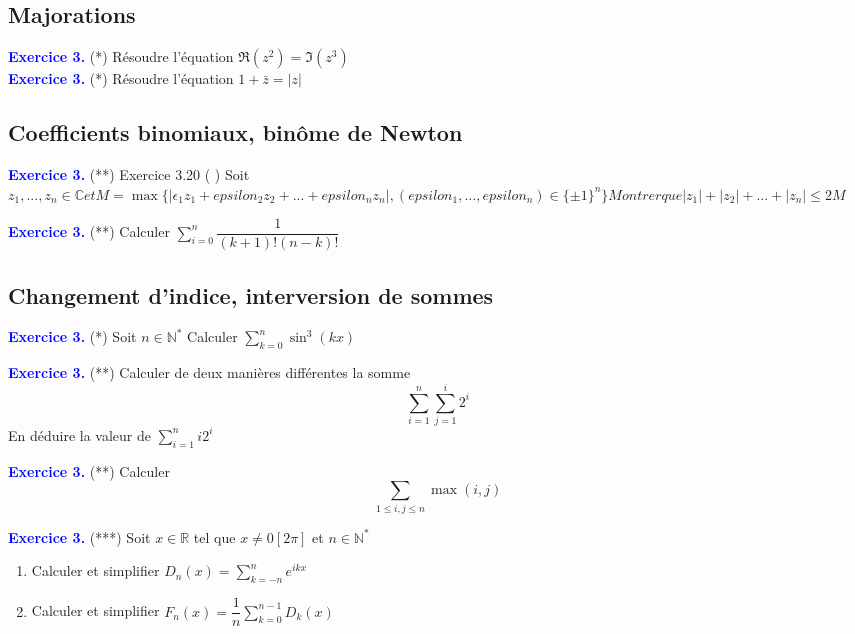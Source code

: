 \documentclass[a4paper,10pt]{article}
\begin{document}
\begin{multicols}{4}
\subsection*{Majorations}

\textcolor{blue}{\large{\bf Exercice 3.}} (*)
Résoudre l'équation $\Re(z^2) = \Im(z^3)$ \\
\textcolor{blue}{\large{\bf Exercice 3.}} (*)
Résoudre l'équation $1+\bar{z} = |z|$


\subsection*{Coefficients binomiaux, binôme de Newton}

\textcolor{blue}{\large{\bf Exercice 3.}} (**)
Exercice 3.20 ( )
Soit $z_1,...,z_n \in \mathbb{C} et
M = \max\{|\epsilon_1 z_1 + epsilon_2 z_2 + ... + epsilon_n z_n|, (epsilon_1,...,epsilon_n) \in \{±1\}^n \}
Montrer que |z_1| + |z_2| + ... + |z_n| \leq 2M$


\textcolor{blue}{\large{\bf Exercice 3.}} (**)
Calculer $\displaystyle\sum_{i=0}^{n}{\dfrac{1}{(k+1)! (n-k)!}}$

\subsection*{Changement d'indice, interversion de sommes}

\textcolor{blue}{\large{\bf Exercice 3.}} (*)
Soit $n \in \mathbb{N}^{*}$
Calculer $\displaystyle\sum_{k=0}^{n}{\sin^{3}(kx)}$

\textcolor{blue}{\large{\bf Exercice 3.}} (**)
Calculer de deux manières différentes la somme $$\displaystyle\sum_{i=1}^{n}{\displaystyle\sum_{j = 1}^{i}{2^i}}$$
En déduire la valeur de $\displaystyle\sum_{i=1}^{n}{i2^i}$

\textcolor{blue}{\large{\bf Exercice 3.}} (**)
Calculer $$\displaystyle\sum_{1 \leq i,j \leq n}{\max(i,j)}$$

\textcolor{blue}{\large{\bf Exercice 3.}} (***)
Soit $x \in \mathbb{R}$ tel que $x \neq 0 [2 \pi]$ et $n \in \mathbb{N}^{*}$
\begin{enumerate}
\item Calculer et simplifier $D_n(x) = \displaystyle\sum_{k=-n}^{n}{e^{ikx}}$
\item Calculer et simplifier $F_n(x) = \dfrac{1}{n} \displaystyle\sum_{k=0}^{n-1}{D_k(x)}$
\end{enumerate}


\end{multicols}
\end{document}

